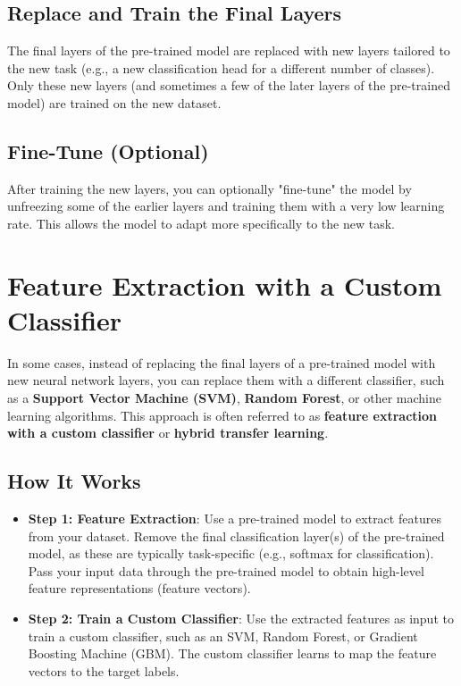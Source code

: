 \begin{notechapter}
\subsection{Replace and Train the Final Layers}
The final layers of the pre-trained model are replaced with new layers
tailored to the new task (e.g., a new classification head for a different
number of classes). Only these new layers (and sometimes a few of the
later layers of the pre-trained model) are trained on the new dataset.

\subsection{Fine-Tune (Optional)}
After training the new layers, you can optionally "fine-tune" the model
by unfreezing some of the earlier layers and training them with a very
low learning rate. This allows the model to adapt more specifically to
the new task.

\section{Feature Extraction with a Custom Classifier}
In some cases, instead of replacing the final layers of a pre-trained model
with new neural network layers, you can replace them with a different
classifier, such as a \textbf{Support Vector Machine (SVM)}, \textbf{Random Forest},
or other machine learning algorithms. This approach is often referred to as
\textbf{feature extraction with a custom classifier} or \textbf{hybrid transfer learning}.

\subsection{How It Works}
\begin{itemize}
    \item \textbf{Step 1: Feature Extraction}:
          Use a pre-trained model to extract features from your dataset.
          Remove the final classification layer(s) of the pre-trained model,
          as these are typically task-specific (e.g., softmax for classification).
          Pass your input data through the pre-trained model to obtain high-level
          feature representations (feature vectors).
    \item \textbf{Step 2: Train a Custom Classifier}:
          Use the extracted features as input to train a custom classifier,
          such as an SVM, Random Forest, or Gradient Boosting Machine (GBM).
          The custom classifier learns to map the feature vectors to the target labels.
\end{itemize}


\end{notechapter}
